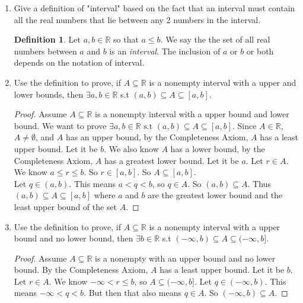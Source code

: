 \documentclass{article}
\theoremstyle{claim}
\theoremstyle{definition}
\newtheorem{definition}{Definition}
\begin{document}
\begin{enumerate}
        \begin{enumerate}
            \item Give a definition of "interval" based on the fact that an interval must contain all the real numbers that lie between any 2 numbers in the interval.
            \begin{definition}
                Let $a, b \in \mathbb{R}$ so that $a \le b$. We say the the set of all real numbers between $a$ and $b$ is an \emph{interval}. The inclusion of $a$ or $b$ or both depends on the notation of interval.
            \end{definition}
            \item Use the definition to prove, if $A \subseteq \mathbb{R}$ is a nonempty interval with a upper and lower bounds, then $\exists a, b \in \mathbb{R}$ s.t $(a, b) \subseteq A \subseteq [a, b]$.
                \begin{proof}
                    Assume $A \subseteq \mathbb{R}$ is a nonempty interval with a upper bound and lower bound. We want to prove  $\exists a, b \in \mathbb{R} \text{ s.t } (a, b) \subseteq A \subseteq [a, b]$. Since $A \in \mathbb{R}$, $A \ne \emptyset$, and $A$ has an upper bound, by the Completeness Axiom, $A$ has a least upper bound. Let it be $b$. We also know $A$ has a lower bound, by the Completeness Axiom, $A$ has a greatest lower bound. Let it be $a$. Let $r \in A$. We know $a \le r \le b$. So $r \in [a, b]$. So $A \subseteq [a, b]$.\\
                    Let $q \in (a, b)$. This means $a < q < b$, so $q \in A$. So $(a, b) \subseteq A$.
                    Thus $(a, b) \subseteq A \subseteq [a, b]$ where $a$ and $b$ are the greatest lower bound and the least upper bound of the set $A$.
                \end{proof}
            \item Use the definition to prove, if $A \subseteq \mathbb{R}$ is a nonempty interval with a upper bound and no lower bound, then $\exists b \in \mathbb{R}$ s.t $(- \infty, b) \subseteq A \subseteq (- \infty, b ]$.
                \begin{proof}
                    Assume $A \subseteq \mathbb{R}$ is a nonempty with an upper bound and no lower bound. By the Completeness Axiom, $A$ has a least upper bound. Let it be $b$. Let $r \in A$. We know $-\infty < r \le b$, so $A \subseteq (-\infty, b]$. Let $q \in (-\infty, b)$. This means $-\infty < q < b$. But then that also means $q \in A$. So $(-\infty,b) \subseteq A$.
                \end{proof}

\end{enumerate}
\end{enumerate}
\end{document}
